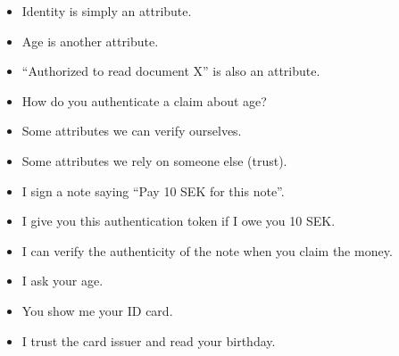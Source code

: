 \begin{frame}
  \begin{example}
    \begin{itemize}
      \item Identity is simply an attribute.
      \item Age is another attribute.
      \item \enquote{Authorized to read document X} is also an attribute.
    \end{itemize}
  \end{example}
\end{frame}

\begin{frame}
  \begin{exercise}
    \begin{itemize}
      \item How do you authenticate a claim about age?
    \end{itemize}
  \end{exercise}
\end{frame}

\begin{frame}
  \begin{itemize}
    \item Some attributes we can verify ourselves.
    \item Some attributes we rely on someone else (\ie trust).
  \end{itemize}
\end{frame}

\begin{frame}
  \begin{example}
    \begin{itemize}
      \item I sign a note saying \enquote{Pay 10 SEK for this note}.
      \item I give you this authentication token if I owe you 10 SEK.
      \item I can verify the authenticity of the note when you claim the money.
    \end{itemize}
  \end{example}

  \begin{example}
    \begin{itemize}
      \item I ask your age.
      \item You show me your ID card.
      \item I trust the card issuer and read your birthday.
    \end{itemize}
  \end{example}
\end{frame}

